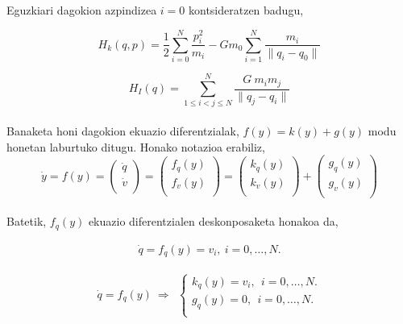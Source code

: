 Eguzkiari dagokion azpindizea $i=0$ kontsideratzen badugu, 

\begin{equation}
H_k(q,p)=\frac{1}{2} \sum\limits_{i=0}^{N} \frac{p_i^2}{m_i}- Gm_0 \sum\limits_{i=1}^{N} \frac{m_i}{\|q_i-q_0\|}
\end{equation}

\begin{equation}
H_I(q)=\sum\limits_{1\leq i < j \leq N}^{N} \frac{G \ m_i m_j}{\|q_j-q_i\|}
\end{equation}

\paragraph*{}Banaketa honi dagokion ekuazio diferentzialak,  $f(y)=k(y)+g(y)$ modu honetan laburtuko ditugu. Honako notazioa erabiliz,
\begin{equation*}
\dot{y}=f(y)=
\left(\begin{array}{c}
  \dot{q} \\
  \dot{v} \\
\end{array}\right)=
\left(\begin{array}{c}
  f_q(y) \\
  f_v(y) \\
\end{array}\right)=
\left(\begin{array}{c}
  k_q(y) \\
  k_v(y) \\
\end{array}\right)+
\left(\begin{array}{c}
  g_q(y) \\
  g_v(y) \\
\end{array}\right)
\end{equation*}

\paragraph*{}Batetik, $f_q(y)$ ekuazio diferentzialen deskonposaketa honakoa da,

\begin{align*}
\dot{q}=f_q(y)=v_i,  \ i=0,\dots,N. 
\end{align*}

\begin{align}
\dot{q}=f_q(y) \ \Rightarrow \ \ 
\left \{ \begin{array}{c}
  k_q(y) =v_i, \ \ i=0,\dots,N. \\[.25cm]
  g_q(y) =0,\ \ i=0,\dots,N.\\
\end{array} \right.  
\end{align}

